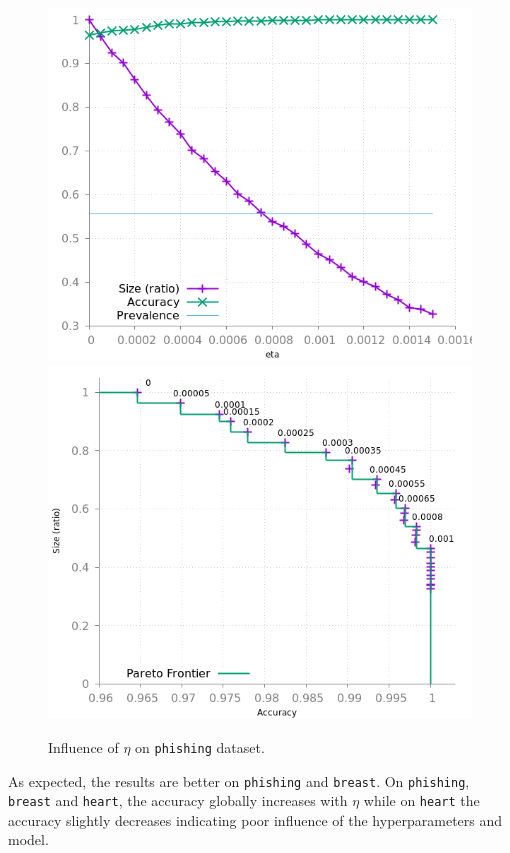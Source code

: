 \documentclass[preprint,12pt]{elsarticle}
\theoremstyle{definition}
\begin{document}
\begin{figure}[!h]
\centering
\includegraphics[scale=0.3]{img/meta_phishing.png}
\hfill
\includegraphics[scale=0.3]{img/meta_pareto_phishing.png}
\caption{Influence of $\eta$ on \texttt{phishing} dataset.}
\label{fig:meta_phishing}
\end{figure}
As expected, the results are better on \texttt{phishing} and \texttt{breast}. On \texttt{phishing}, \texttt{breast} and \texttt{heart}, the accuracy globally increases with $\eta$ while on \texttt{heart} the accuracy slightly decreases indicating poor influence of the hyperparameters and model. 
\end{document}

